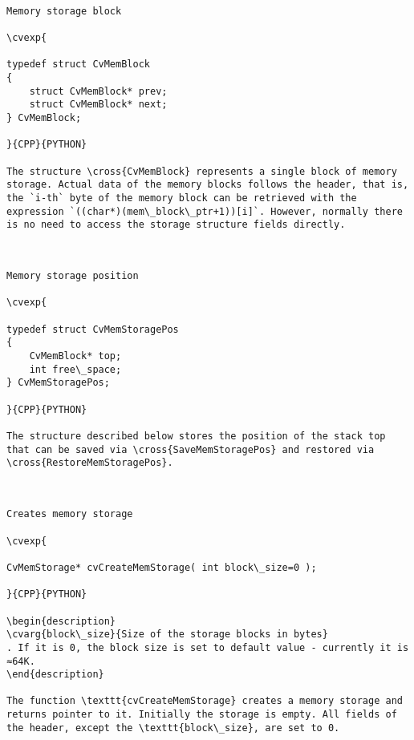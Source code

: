 \begin{verbatim}

Memory storage block

\cvexp{

typedef struct CvMemBlock
{
    struct CvMemBlock* prev;
    struct CvMemBlock* next;
} CvMemBlock;

}{CPP}{PYTHON}

The structure \cross{CvMemBlock} represents a single block of memory storage. Actual data of the memory blocks follows the header, that is, the `i-th` byte of the memory block can be retrieved with the expression `((char*)(mem\_block\_ptr+1))[i]`. However, normally there is no need to access the storage structure fields directly.


\end{verbatim}
\begin{verbatim}

Memory storage position

\cvexp{

typedef struct CvMemStoragePos
{
    CvMemBlock* top;
    int free\_space;
} CvMemStoragePos;

}{CPP}{PYTHON}

The structure described below stores the position of the stack top that can be saved via \cross{SaveMemStoragePos} and restored via \cross{RestoreMemStoragePos}.


\end{verbatim}
\begin{verbatim}

Creates memory storage

\cvexp{

CvMemStorage* cvCreateMemStorage( int block\_size=0 );

}{CPP}{PYTHON}

\begin{description}
\cvarg{block\_size}{Size of the storage blocks in bytes}
. If it is 0, the block size is set to default value - currently it is ≈64K.
\end{description}

The function \texttt{cvCreateMemStorage} creates a memory storage and returns pointer to it. Initially the storage is empty. All fields of the header, except the \texttt{block\_size}, are set to 0.


\end{verbatim}
